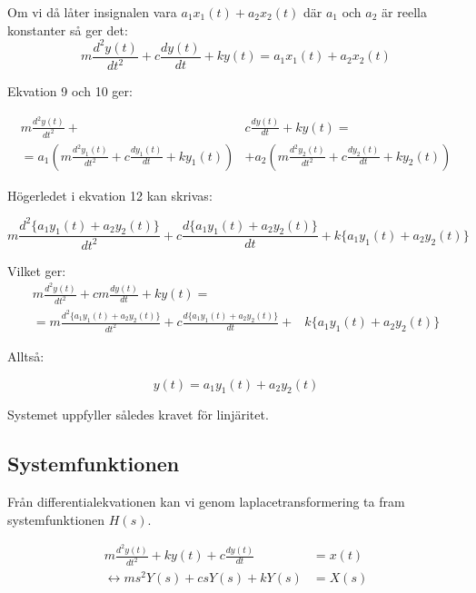 \documentclass[10pt,a4paper]{article}
\begin{document}
Om vi då låter insignalen vara $a_1 x_1(t) + a_2 x_2(t)$ där $a_1$ och $a_2$ är reella konstanter så ger det:
\begin{equation}
m\frac{d^2y(t)}{dt^2} + c\frac{dy(t)}{dt} + ky(t) = a_1 x_1(t) + a_2 x_2(t)
\end{equation}

Ekvation 9 och 10 ger:

\begin{equation}
\begin{split}
m\frac{d^2y(t)}{dt^2} + & c\frac{dy(t)}{dt} + ky(t) = \\ = a_1(m\frac{d^2y_1(t)}{dt^2} + c\frac{dy_1(t)}{dt} +  ky_1(t)) & + a_2(m\frac{d^2y_2(t)}{dt^2} + c\frac{dy_2(t)}{dt} + ky_2(t))
\end{split}
\end{equation}

Högerledet i ekvation 12 kan skrivas:

\begin{equation}
m\frac{d^2\{a_1y_1(t) + a_2y_2(t)\}}{dt^2} + c\frac{d\{a_1y_1(t) + a_2y_2(t)\}}{dt} + k\{a_1y_1(t) + a_2y_2(t)\}
\end{equation}

Vilket ger:
\begin{equation}
\begin{split}
m\frac{d^2y(t)}{dt^2} +  cm\frac{dy(t)}{dt} + ky(t) = & \\ = m\frac{d^2\{a_1y_1(t) + a_2y_2(t)\}}{dt^2} + c\frac{d\{a_1y_1(t) + a_2y_2(t)\}}{dt} + & k\{a_1y_1(t) + a_2y_2(t)\}
\end{split}
\end{equation}

Alltså:

\begin{equation}
y(t) = a_1 y_1(t) + a_2 y_2(t)
\end{equation}

Systemet uppfyller således kravet för linjäritet.

\newpage



\subsection{Systemfunktionen}

Från differentialekvationen kan vi genom laplacetransformering ta fram systemfunktionen $H(s)$.

\begin{equation}
\begin{split}
 m\frac{d^2y(t)}{dt^2} + k  y(t) + c\frac{dy(t)}{dt} & = x(t) \\ \leftrightarrow m  s^2  Y(s) + c  s  Y(s) + k  Y(s) & = X(s)
\end{split}
\end{equation}
\end{document}
